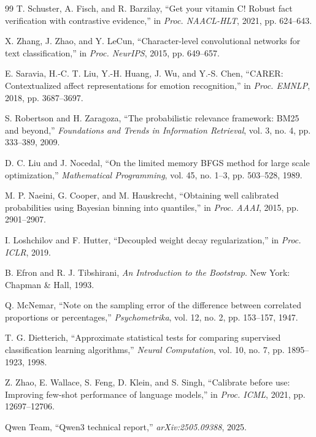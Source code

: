 \documentclass[twocolumn]{ICCKjournal}
\begin{document}
\begin{fullwidth}
\begin{thebibliography}{99}
T. Schuster, A. Fisch, and R. Barzilay, ``Get your vitamin C! Robust fact verification with contrastive evidence,'' in \textit{Proc. NAACL-HLT}, 2021, pp. 624--643.

X. Zhang, J. Zhao, and Y. LeCun, ``Character-level convolutional networks for text classification,'' in \textit{Proc. NeurIPS}, 2015, pp. 649--657.

E. Saravia, H.-C. T. Liu, Y.-H. Huang, J. Wu, and Y.-S. Chen, ``CARER: Contextualized affect representations for emotion recognition,'' in \textit{Proc. EMNLP}, 2018, pp. 3687--3697.

S. Robertson and H. Zaragoza, ``The probabilistic relevance framework: BM25 and beyond,'' \textit{Foundations and Trends in Information Retrieval}, vol. 3, no. 4, pp. 333--389, 2009.

D. C. Liu and J. Nocedal, ``On the limited memory BFGS method for large scale optimization,'' \textit{Mathematical Programming}, vol. 45, no. 1--3, pp. 503--528, 1989.

M. P. Naeini, G. Cooper, and M. Hauskrecht, ``Obtaining well calibrated probabilities using Bayesian binning into quantiles,'' in \textit{Proc. AAAI}, 2015, pp. 2901--2907.

I. Loshchilov and F. Hutter, ``Decoupled weight decay regularization,'' in \textit{Proc. ICLR}, 2019.

B. Efron and R. J. Tibshirani, \textit{An Introduction to the Bootstrap}. New York: Chapman \& Hall, 1993.

Q. McNemar, ``Note on the sampling error of the difference between correlated proportions or percentages,'' \textit{Psychometrika}, vol. 12, no. 2, pp. 153--157, 1947.

T. G. Dietterich, ``Approximate statistical tests for comparing supervised classification learning algorithms,'' \textit{Neural Computation}, vol. 10, no. 7, pp. 1895--1923, 1998.

Z. Zhao, E. Wallace, S. Feng, D. Klein, and S. Singh, ``Calibrate before use: Improving few-shot performance of language models,'' in \textit{Proc. ICML}, 2021, pp. 12697--12706.

Qwen Team, ``Qwen3 technical report,'' \textit{arXiv:2505.09388}, 2025.

\end{thebibliography}
\end{fullwidth}
\end{document}
